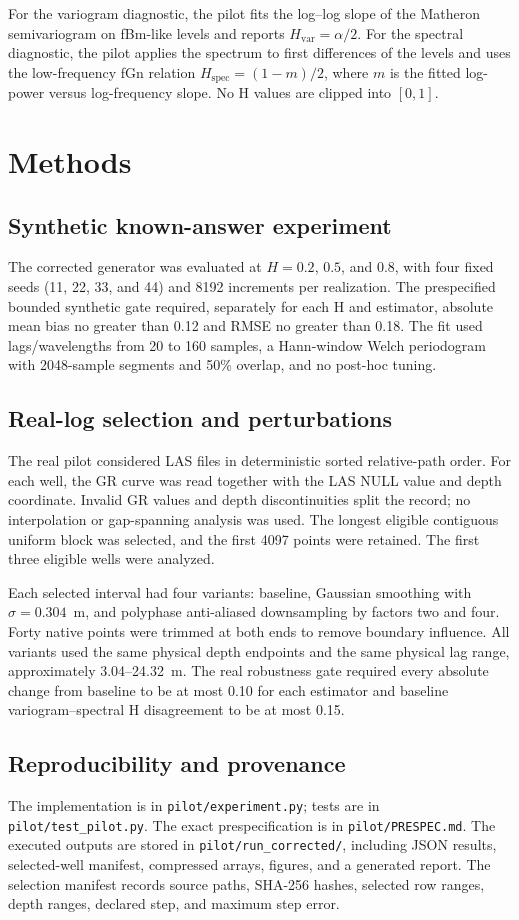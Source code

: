 \documentclass[11pt,a4paper]{article}
\begin{document}
For the variogram diagnostic, the pilot fits the log--log slope of the Matheron semivariogram on fBm-like levels and reports $H_{\mathrm{var}}=\alpha/2$. For the spectral diagnostic, the pilot applies the spectrum to first differences of the levels and uses the low-frequency fGn relation $H_{\mathrm{spec}}=(1-m)/2$, where $m$ is the fitted log-power versus log-frequency slope. No H values are clipped into $[0,1]$.

\section{Methods}
\subsection{Synthetic known-answer experiment}
The corrected generator was evaluated at $H=0.2$, $0.5$, and $0.8$, with four fixed seeds (11, 22, 33, and 44) and 8192 increments per realization. The prespecified bounded synthetic gate required, separately for each H and estimator, absolute mean bias no greater than 0.12 and RMSE no greater than 0.18. The fit used lags/wavelengths from 20 to 160 samples, a Hann-window Welch periodogram with 2048-sample segments and 50\% overlap, and no post-hoc tuning.

\subsection{Real-log selection and perturbations}
The real pilot considered LAS files in deterministic sorted relative-path order. For each well, the GR curve was read together with the LAS NULL value and depth coordinate. Invalid GR values and depth discontinuities split the record; no interpolation or gap-spanning analysis was used. The longest eligible contiguous uniform block was selected, and the first 4097 points were retained. The first three eligible wells were analyzed.

Each selected interval had four variants: baseline, Gaussian smoothing with $\sigma=0.304$~m, and polyphase anti-aliased downsampling by factors two and four. Forty native points were trimmed at both ends to remove boundary influence. All variants used the same physical depth endpoints and the same physical lag range, approximately 3.04--24.32~m. The real robustness gate required every absolute change from baseline to be at most 0.10 for each estimator and baseline variogram--spectral H disagreement to be at most 0.15.

\subsection{Reproducibility and provenance}
The implementation is in \texttt{pilot/experiment.py}; tests are in \texttt{pilot/test\_pilot.py}. The exact prespecification is in \texttt{pilot/PRESPEC.md}. The executed outputs are stored in \texttt{pilot/run\_corrected/}, including JSON results, selected-well manifest, compressed arrays, figures, and a generated report. The selection manifest records source paths, SHA-256 hashes, selected row ranges, depth ranges, declared step, and maximum step error.
\end{document}
